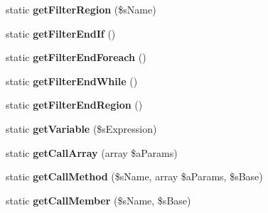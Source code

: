 \begin{DoxyCompactItemize}
\item 
\hypertarget{class_i_p_c_o___parser_settings_a03cff5daa17a1e67cd31a1020b2ab874}{static {\bfseries get\-Filter\-Region} (\$s\-Name)}\label{class_i_p_c_o___parser_settings_a03cff5daa17a1e67cd31a1020b2ab874}

\item 
\hypertarget{class_i_p_c_o___parser_settings_a271a4c9629ebd90713c6f714932e8800}{static {\bfseries get\-Filter\-End\-If} ()}\label{class_i_p_c_o___parser_settings_a271a4c9629ebd90713c6f714932e8800}

\item 
\hypertarget{class_i_p_c_o___parser_settings_a00d67696d7700d75a841085b1dab90a5}{static {\bfseries get\-Filter\-End\-Foreach} ()}\label{class_i_p_c_o___parser_settings_a00d67696d7700d75a841085b1dab90a5}

\item 
\hypertarget{class_i_p_c_o___parser_settings_a8d79e792c9926cabccb179f364eb4255}{static {\bfseries get\-Filter\-End\-While} ()}\label{class_i_p_c_o___parser_settings_a8d79e792c9926cabccb179f364eb4255}

\item 
\hypertarget{class_i_p_c_o___parser_settings_ac2c851be6bda2979f10cd106b1c7fc23}{static {\bfseries get\-Filter\-End\-Region} ()}\label{class_i_p_c_o___parser_settings_ac2c851be6bda2979f10cd106b1c7fc23}

\item 
\hypertarget{class_i_p_c_o___parser_settings_a3d35da0aca6054edbc8c8ee9ed82dc13}{static {\bfseries get\-Variable} (\$s\-Expression)}\label{class_i_p_c_o___parser_settings_a3d35da0aca6054edbc8c8ee9ed82dc13}

\item 
\hypertarget{class_i_p_c_o___parser_settings_ab80196489644ac93b6350de50ac15552}{static {\bfseries get\-Call\-Array} (array \$a\-Params)}\label{class_i_p_c_o___parser_settings_ab80196489644ac93b6350de50ac15552}

\item 
\hypertarget{class_i_p_c_o___parser_settings_a029392fb85e94a47add22ae01591fd90}{static {\bfseries get\-Call\-Method} (\$s\-Name, array \$a\-Params, \$s\-Base)}\label{class_i_p_c_o___parser_settings_a029392fb85e94a47add22ae01591fd90}

\item 
\hypertarget{class_i_p_c_o___parser_settings_a2a98c9e30f3e28d9b3804a8018b7c427}{static {\bfseries get\-Call\-Member} (\$s\-Name, \$s\-Base)}\label{class_i_p_c_o___parser_settings_a2a98c9e30f3e28d9b3804a8018b7c427}


\end{DoxyCompactItemize}
